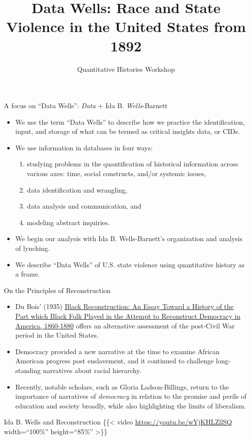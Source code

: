 \documentclass[
  ignorenonframetext,
]{beamer}
\title{Data Wells: Race and State Violence in the United States from
1892}
\subtitle{Quantitative Histories Workshop}
\author{}
\date{\vspace{-2.5em}}
\begin{document}
\frame{\titlepage}

\begin{frame}
\begin{block}{A focus on ``Data Wells'': {\emph{Data}} + Ida B.
{\emph{Wells}}-Barnett}
\protect\hypertarget{a-focus-on-data-wells-data-ida-b.-wells-barnett}{}
\begin{itemize}[<+->]
\item
  We use the term ``{Data Wells}'' to describe how we practice the
  identification, input, and storage of what can be termed as critical
  insights data, or CIDs.
\item
  We use information in databases in four ways:

  \begin{enumerate}[<+->]
  [(1)]
  \item
    studying problems in the {quantification of historical information}
    across various axes: time, social constructs, and/or systemic
    issues,
  \item
    data {identification} and {wrangling},
  \item
    data {analysis} and {communication}, and
  \item
    {modeling} abstract inquiries.
  \end{enumerate}
\item
  We begin our analysis with Ida B. Wells-Barnett's organization and
  analysis of lynching.
\item
  We describe ``Data Wells'' of U.S. state violence using quantitative
  history as a frame.
\end{itemize}
\end{block}

\begin{block}{On the Principles of Reconstruction}
\protect\hypertarget{on-the-principles-of-reconstruction}{}
\begin{itemize}[<+->]
\item
  Du Bois' (1935)
  \href{https://www.loa.org/books/698-black-reconstruction/}{Black
  Reconstruction: An Essay Toward a History of the Part which Black Folk
  Played in the Attempt to Reconstruct Democracy in America, 1860-1880}
  offers an alternative assessment of the post-Civil War period in the
  United States.
\item
  Democracy provided a new narrative at the time to examine African
  American progress post enslavement, and it continued to challenge
  long-standing narratives about racial hierarchy.
\item
  Recently, notable scholars, such as Gloria Ladson-Billings, return to
  the importance of narratives of \emph{democracy} in relation to the
  promise and perils of education and society broadly, while also
  highlighting the limits of liberalism.
\end{itemize}
\end{block}

\begin{block}{Ida B. Wells and Reconstruction}
\protect\hypertarget{ida-b.-wells-and-reconstruction}{}
\{\{\textless{} video \url{https://youtu.be/wYjKHLZllSQ} width=``100\%''
height=``85\%'' \textgreater\}\}
\end{block}
\end{frame}
\end{document}
